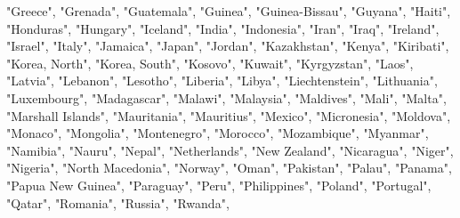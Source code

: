 \documentclass[
]{article}
\newenvironment{Shaded}{\begin{snugshade}}{\end{snugshade}}
\newcommand{\NormalTok}[1]{#1}
\newcommand{\StringTok}[1]{\textcolor[rgb]{0.31,0.60,0.02}{#1}}
\begin{document}
\begin{Shaded}
\begin{Highlighting}[]
    \StringTok{"Greece"}\NormalTok{, }\StringTok{"Grenada"}\NormalTok{, }\StringTok{"Guatemala"}\NormalTok{, }\StringTok{"Guinea"}\NormalTok{, }\StringTok{"Guinea{-}Bissau"}\NormalTok{, }\StringTok{"Guyana"}\NormalTok{, }\StringTok{"Haiti"}\NormalTok{,}
    \StringTok{"Honduras"}\NormalTok{, }\StringTok{"Hungary"}\NormalTok{, }\StringTok{"Iceland"}\NormalTok{, }\StringTok{"India"}\NormalTok{, }\StringTok{"Indonesia"}\NormalTok{, }\StringTok{"Iran"}\NormalTok{, }\StringTok{"Iraq"}\NormalTok{, }\StringTok{"Ireland"}\NormalTok{,}
    \StringTok{"Israel"}\NormalTok{, }\StringTok{"Italy"}\NormalTok{, }\StringTok{"Jamaica"}\NormalTok{, }\StringTok{"Japan"}\NormalTok{, }\StringTok{"Jordan"}\NormalTok{, }\StringTok{"Kazakhstan"}\NormalTok{, }\StringTok{"Kenya"}\NormalTok{, }\StringTok{"Kiribati"}\NormalTok{,}
    \StringTok{"Korea, North"}\NormalTok{, }\StringTok{"Korea, South"}\NormalTok{, }\StringTok{"Kosovo"}\NormalTok{, }\StringTok{"Kuwait"}\NormalTok{, }\StringTok{"Kyrgyzstan"}\NormalTok{, }\StringTok{"Laos"}\NormalTok{, }\StringTok{"Latvia"}\NormalTok{,}
    \StringTok{"Lebanon"}\NormalTok{, }\StringTok{"Lesotho"}\NormalTok{, }\StringTok{"Liberia"}\NormalTok{, }\StringTok{"Libya"}\NormalTok{, }\StringTok{"Liechtenstein"}\NormalTok{, }\StringTok{"Lithuania"}\NormalTok{, }\StringTok{"Luxembourg"}\NormalTok{,}
    \StringTok{"Madagascar"}\NormalTok{, }\StringTok{"Malawi"}\NormalTok{, }\StringTok{"Malaysia"}\NormalTok{, }\StringTok{"Maldives"}\NormalTok{, }\StringTok{"Mali"}\NormalTok{, }\StringTok{"Malta"}\NormalTok{, }\StringTok{"Marshall Islands"}\NormalTok{,}
    \StringTok{"Mauritania"}\NormalTok{, }\StringTok{"Mauritius"}\NormalTok{, }\StringTok{"Mexico"}\NormalTok{, }\StringTok{"Micronesia"}\NormalTok{, }\StringTok{"Moldova"}\NormalTok{, }\StringTok{"Monaco"}\NormalTok{, }\StringTok{"Mongolia"}\NormalTok{,}
    \StringTok{"Montenegro"}\NormalTok{, }\StringTok{"Morocco"}\NormalTok{, }\StringTok{"Mozambique"}\NormalTok{, }\StringTok{"Myanmar"}\NormalTok{, }\StringTok{"Namibia"}\NormalTok{, }\StringTok{"Nauru"}\NormalTok{, }\StringTok{"Nepal"}\NormalTok{,}
    \StringTok{"Netherlands"}\NormalTok{, }\StringTok{"New Zealand"}\NormalTok{, }\StringTok{"Nicaragua"}\NormalTok{, }\StringTok{"Niger"}\NormalTok{, }\StringTok{"Nigeria"}\NormalTok{, }\StringTok{"North Macedonia"}\NormalTok{,}
    \StringTok{"Norway"}\NormalTok{, }\StringTok{"Oman"}\NormalTok{, }\StringTok{"Pakistan"}\NormalTok{, }\StringTok{"Palau"}\NormalTok{, }\StringTok{"Panama"}\NormalTok{, }\StringTok{"Papua New Guinea"}\NormalTok{, }\StringTok{"Paraguay"}\NormalTok{,}
    \StringTok{"Peru"}\NormalTok{, }\StringTok{"Philippines"}\NormalTok{, }\StringTok{"Poland"}\NormalTok{, }\StringTok{"Portugal"}\NormalTok{, }\StringTok{"Qatar"}\NormalTok{, }\StringTok{"Romania"}\NormalTok{, }\StringTok{"Russia"}\NormalTok{, }\StringTok{"Rwanda"}\NormalTok{,}

\end{Highlighting}
\end{Shaded}
\end{document}

